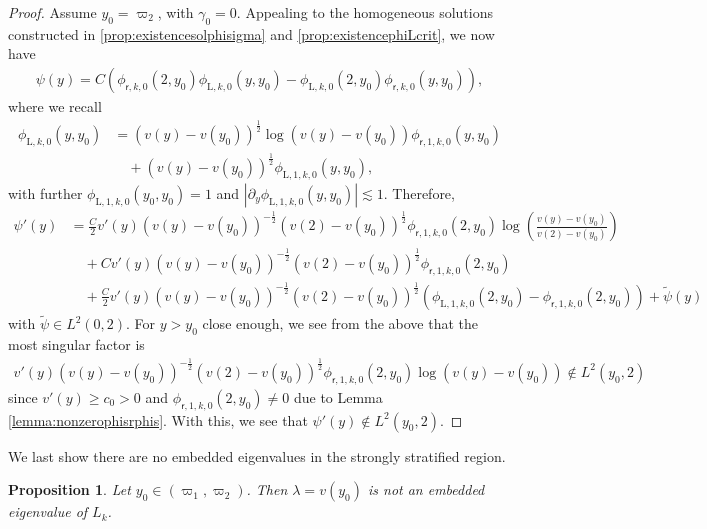 \documentclass[11pt,reqno]{amsproc}
\newtheorem{proposition}{Proposition}[section]
\theoremstyle{definition}
\numberwithin{equation}{section}
\newcommand{\rL}{{\mathrm{L}}}
\newcommand{\sr}{{\mathsf{r}}}
\begin{document}
\begin{proof}
Assume $y_0=\varpi_2$, with $\gamma_0=0$. Appealing to the homogeneous solutions constructed in \ref{prop:existencesolphisigma} and \ref{prop:existencephiLcrit}, we now have    
\begin{align*}
    \psi(y) = C \left( \phi_{\sr,k,0}(2,y_0)\phi_{\rL,k,0}(y,y_0) - \phi_{\rL,k,0}(2,y_0)\phi_{\sr,k,0}(y,y_0) \right),
\end{align*}
where we recall 
\begin{align*}
\phi_{\rL,k,0}(y,y_0) &= (v(y) - v(y_0))^\frac12 \log( v(y) - v(y_0)) \phi_{\sr,1,k,0}(y,y_0) \\
&\quad+ (v(y) - v(y_0))^\frac12\phi_{\rL,1,k,0}(y,y_0),
\end{align*}
with further $\phi_{\rL,1,k,0}(y_0,y_0) = 1$ and $\left|\partial_y \phi_{\rL,1,k,0}(y,y_0) \right| \lesssim 1$. Therefore, 
\begin{align*}
    \psi'(y) &= \frac{C}{2}v'(y)(v(y) - v(y_0))^{-\frac12} (v(2) - v(y_0))^\frac12 \phi_{\sr,1,k,0}(2,y_0) \log \left( \frac{v(y)-v(y_0)}{v(2) - v(y_0)} \right) \\
    &\quad + Cv'(y) (v(y) - v(y_0))^{-\frac12} (v(2) - v(y_0))^\frac12\phi_{\sr,1,k,0}(2,y_0) \\
    &\quad + \frac{C}{2}v'(y) (v(y) - v(y_0))^{-\frac12} (v(2) - v(y_0))^\frac12 \left( \phi_{\rL,1,k,0}(2,y_0) - \phi_{\sr,1,k,0}(2,y_0) \right)  + \widetilde\psi(y)
\end{align*}
with $\widetilde\psi\in L^2(0,2)$. For $y>y_0$ close enough, we see from the above that the most singular factor is 
\begin{align*}
    v'(y)(v(y) - v(y_0))^{-\frac12} (v(2) - v(y_0))^\frac12 \phi_{\sr,1,k,0}(2,y_0) \log (v(y)-v(y_0)) \not \in L^2(y_0,2)
\end{align*}
since $v'(y)\geq c_0>0$ and $\phi_{\sr,1,k,0}(2,y_0)\neq 0$ due to Lemma \ref{lemma:nonzerophisrphis}. With this, we see that $\psi'(y)\not \in L^2(y_0,2)$.
\end{proof}

We last show there are no embedded eigenvalues in the strongly stratified region.

\begin{proposition}\label{prop:noembedstrong}
Let $y_0\in (\varpi_1,\varpi_2)$. Then $\lambda= v(y_0)$ is not an embedded eigenvalue of $L_k$.
\end{proposition}
\end{document}
